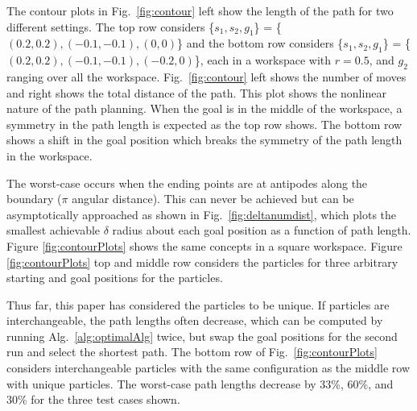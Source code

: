  The contour plots in Fig.~\ref{fig:contour} left show the length of the path for two different settings. The top row considers \{$s_1,s_2,g_1$\} = \{$(0.2,0.2),(-0.1,-0.1),(0,0)$\} and the bottom row considers  \{$s_1,s_2,g_1$\} = \{$(0.2,0.2),(-0.1,-0.1),(-0.2,0)$\}, each in a workspace with $r= 0.5$, and $g_2$ ranging over all the workspace. Fig.~\ref{fig:contour} left shows the number of moves and right shows the total distance of the path. This plot shows the nonlinear nature of the path planning. When the goal is in the middle of the workspace, a symmetry in the path length is expected as the top row shows. The bottom row shows a shift in the goal position which breaks the symmetry of the path length in the workspace.
 
 The worst-case occurs when the ending points are at antipodes along the boundary ($\pi$ angular distance). This can never be achieved but can be asymptotically approached as shown in Fig.~\ref{fig:deltanumdist}, which plots the smallest achievable $\delta$ radius about each goal position as a function of path length. 
 Figure \ref{fig:contourPlots} shows the same concepts in a square workspace. Figure \ref{fig:contourPlots} top and middle row considers the particles for three arbitrary starting and goal positions for the particles. 

 Thus far, this paper has considered the particles to be unique. If particles are interchangeable, the path lengths often decrease, which can be computed by running Alg.~\ref{alg:optimalAlg} twice,  but swap the goal positions for the second run and select the shortest path.  The bottom row of  Fig.~\ref{fig:contourPlots} considers interchangeable particles with the same configuration as the middle row with unique particles. The worst-case path lengths decrease by 33\%, 60\%, and 30\% for the three test cases shown. %
 
 










